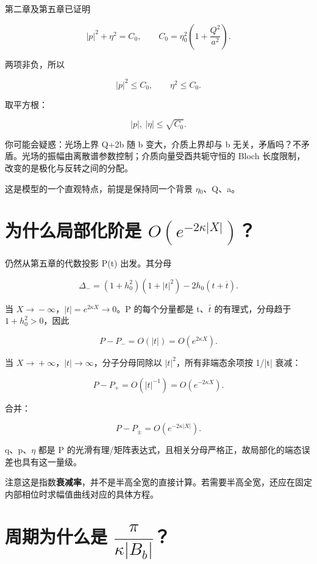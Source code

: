 第二章及第五章已证明\par

\[
|p|^2+\eta^2=C_0,\qquad
C_0=\eta_0^2\left(1+\dfrac{Q^2}{a^2}\right).
\]

两项非负，所以\par

\[
|p|^2\le C_0,\qquad \eta^2\le C_0.
\]

取平方根：\par

\[
|p|,\ |\eta|\le\sqrt{C_0}.
\]

你可能会疑惑：光场上界 Q+2b 随 b 变大，介质上界却与 b 无关，矛盾吗？不矛盾。光场的振幅由离散谱参数控制；介质向量受酉共轭守恒的 Bloch 长度限制，改变的是极化与反转之间的分配。\par

这是模型的一个直观特点，前提是保持同一个背景 $\eta{}_{0}$、Q、a。\par

\section{为什么局部化阶是 \texorpdfstring{$O(e^{-2\kappa|X|})$}{O(exp(-2kappa|X|))}？}

仍然从第五章的代数投影 P(t) 出发。其分母\par

\[
\Delta_-=(1+h_0^2)(1+|t|^2)-2h_0(t+\overline t).
\]

当 $X\to{}-\infty{}$，$|t|=e^{2\kappa{}X}\to{}0$。P 的每个分量都是 t、$\bar t$ 的有理式，分母趋于 $1+h_{0}^{2}>0$，因此\par

\[
P-P_-=O(|t|)=O(e^{2\kappa X}).
\]

当 $X\to{}+\infty{}$，$|t|\to{}\infty{}$，分子分母同除以 $|t|^{2}$，所有非端态余项按 1/|t| 衰减：\par

\[
P-P_+=O(|t|^{-1})=O(e^{-2\kappa X}).
\]

合并：\par

\[
P-P_\pm=O(e^{-2\kappa|X|}).
\]

q、p、$\eta{}$ 都是 P 的光滑有理/矩阵表达式，且相关分母严格正，故局部化的端态误差也具有这一量级。\par

注意这是指数\textbf{衰减率}，并不是半高全宽的直接计算。若需要半高全宽，还应在固定内部相位时求幅值曲线对应的具体方程。\par

\section{周期为什么是 \texorpdfstring{$\dfrac{\pi}{\kappa|B_b|}$}{pi/(kappa|Bb|)}？}
\par

